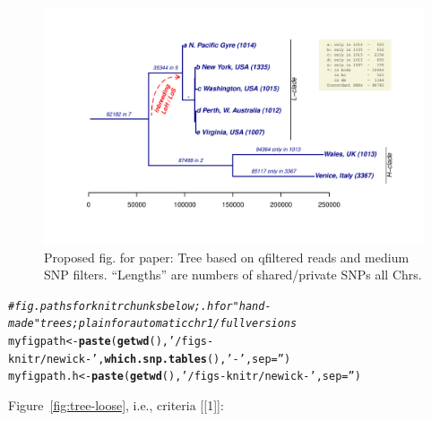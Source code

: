 \documentclass{article}\usepackage[]{graphicx}\usepackage[]{color}
\makeatletter
\newcommand{\hlstr}[1]{\textcolor[rgb]{0.192,0.494,0.8}{#1}}%
\newcommand{\hlcom}[1]{\textcolor[rgb]{0.678,0.584,0.686}{\textit{#1}}}%
\newcommand{\hlstd}[1]{\textcolor[rgb]{0.345,0.345,0.345}{#1}}%
\newcommand{\hlkwb}[1]{\textcolor[rgb]{0.69,0.353,0.396}{#1}}%
\newcommand{\hlkwc}[1]{\textcolor[rgb]{0.333,0.667,0.333}{#1}}%
\newcommand{\hlkwd}[1]{\textcolor[rgb]{0.737,0.353,0.396}{\textbf{#1}}}%
\newenvironment{kframe}{%
 \def\at@end@of@kframe{}%
 \ifinner\ifhmode%
  \def\at@end@of@kframe{\end{minipage}}%
  \begin{minipage}{\columnwidth}%
 \fi\fi%
 \def\FrameCommand##1{\hskip\@totalleftmargin \hskip-\fboxsep
 \colorbox{shadecolor}{##1}\hskip-\fboxsep
     \hskip-\linewidth \hskip-\@totalleftmargin \hskip\columnwidth}%
 \MakeFramed {\advance\hsize-\width
   \@totalleftmargin\z@ \linewidth\hsize
   \@setminipage}}%
 {\par\unskip\endMakeFramed%
 \at@end@of@kframe}
\newenvironment{knitrout}{}{} %
\makeatother
\begin{document}
\begin{figure}
  \hspace*{-1in}%
  \includegraphics{figs-mine/paperfig-medium-tree-trunc-qfiltered.pdf}
  \caption{Proposed fig. for paper: Tree based on qfiltered reads and medium SNP filters.  ``Lengths'' are numbers of shared/private SNPs all Chrs.}
  \label{fig:tree-paper}
\end{figure}

\begin{knitrout}\scriptsize
{}\color{fgcolor}\begin{kframe}
\begin{alltt}
\hlcom{# fig.paths for knitr chunks below;  .h for "hand-made" trees; plain for automatic chr1/full versions}
\hlstd{myfigpath}   \hlkwb{<-} \hlkwd{paste}\hlstd{(}\hlkwd{getwd}\hlstd{(),} \hlstr{'/figs-knitr/newick-'}\hlstd{,} \hlkwd{which.snp.tables}\hlstd{(),} \hlstr{'-'}\hlstd{,} \hlkwc{sep}\hlstd{=}\hlstr{''}\hlstd{)}
\hlstd{myfigpath.h} \hlkwb{<-} \hlkwd{paste}\hlstd{(}\hlkwd{getwd}\hlstd{(),} \hlstr{'/figs-knitr/newick-'}\hlstd{,} \hlkwc{sep}\hlstd{=}\hlstr{''}\hlstd{)}
\end{alltt}
\end{kframe}
\end{knitrout}

Figure~\ref{fig:tree-loose}, i.e., criteria [[1]]:
\end{document}
